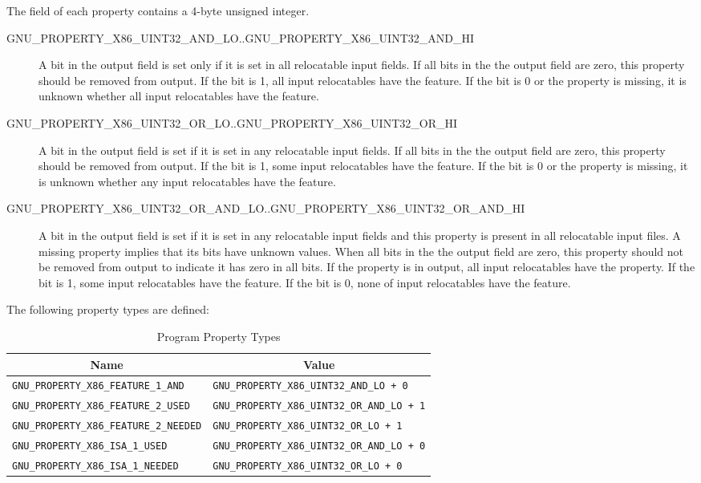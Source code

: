 The  field of each property contains a 4-byte unsigned
integer.

\begin{description}
 \item[GNU_PROPERTY_X86_UINT32_AND_LO..GNU_PROPERTY_X86_UINT32_AND_HI]
   A bit in the output  field is set only if it is set in
   all relocatable input  fields.  If all bits in the
   the output  field are zero, this property should be
   removed from output.  If the bit is 1, all input relocatables have
   the feature.  If the bit is 0 or the property is missing, it is
   unknown whether all input relocatables have the feature.
 \item[GNU_PROPERTY_X86_UINT32_OR_LO..GNU_PROPERTY_X86_UINT32_OR_HI]
   A bit in the output  field is set if it is set in any
   relocatable input  fields.  If all bits in the
   the output  field are zero, this property should be
   removed from output.  If the bit is 1, some input relocatables have
   the feature.  If the bit is 0 or the property is missing, it is
   unknown whether any input relocatables have the feature.
 \item[GNU_PROPERTY_X86_UINT32_OR_AND_LO..GNU_PROPERTY_X86_UINT32_OR_AND_HI]
   A bit in the output  field is set if it is set in any
   relocatable input  fields and this property is present
   in all relocatable input files.  A missing property implies that its
   bits have unknown values.  When all bits in the the output
    field are zero, this property should not be removed
   from output to indicate it has zero in all bits.  If the property
   is in output, all input relocatables have the property.  If the bit
   is 1, some input relocatables have the feature.  If the bit is 0,
   none of input relocatables have the feature.
\end{description}

The following property types are defined:

\begin{table}[H]
\Hrule
  \caption{Program Property Types}
  \begin{center}
    \myfontsize
    \begin{tabular}[t]{l|l}
      \multicolumn{1}{c}{Name} & \multicolumn{1}{c}{Value} \\
      \hline
     \texttt{GNU_PROPERTY_X86_FEATURE_1_AND} &
     \texttt{GNU_PROPERTY_X86_UINT32_AND_LO + 0} \\
     \texttt{GNU_PROPERTY_X86_FEATURE_2_USED} &
     \texttt{GNU_PROPERTY_X86_UINT32_OR_AND_LO + 1} \\
     \texttt{GNU_PROPERTY_X86_FEATURE_2_NEEDED} &
     \texttt{GNU_PROPERTY_X86_UINT32_OR_LO + 1} \\
     \texttt{GNU_PROPERTY_X86_ISA_1_USED} &
     \texttt{GNU_PROPERTY_X86_UINT32_OR_AND_LO + 0} \\
     \texttt{GNU_PROPERTY_X86_ISA_1_NEEDED} &
     \texttt{GNU_PROPERTY_X86_UINT32_OR_LO + 0} \\
    \end{tabular}
  \end{center}
\Hrule
\end{table}

